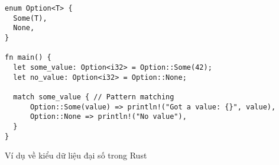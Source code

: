 \begin{listing}[H]
\begin{verbatim}
enum Option<T> {
  Some(T),
  None,
}

fn main() {
  let some_value: Option<i32> = Option::Some(42);
  let no_value: Option<i32> = Option::None;

  match some_value { // Pattern matching
      Option::Some(value) => println!("Got a value: {}", value),
      Option::None => println!("No value"),
  }
}
\end{verbatim}
\caption{Ví dụ về kiểu dữ liệu đại số trong Rust}
\label{code:fp_adt}
\end{listing}
